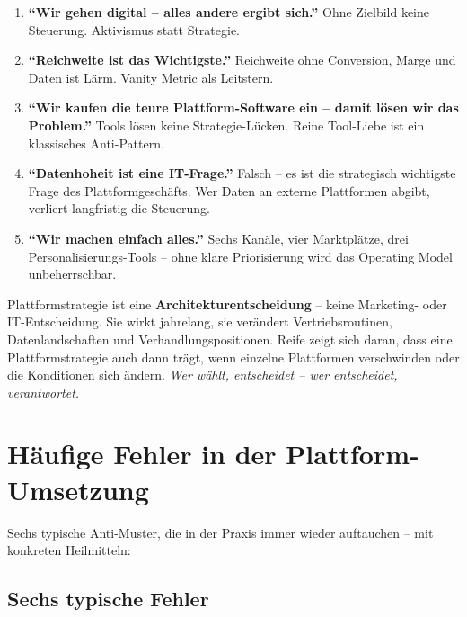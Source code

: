 \documentclass[11pt,a4paper,oneside]{article}
\newcommand{\fachbegriff}[1]{\textbf{#1}}
\begin{document}
\begin{enumerate}
  \item \fachbegriff{``Wir gehen digital -- alles andere ergibt sich.''} Ohne Zielbild keine Steuerung. Aktivismus statt Strategie.
  \item \fachbegriff{``Reichweite ist das Wichtigste.''} Reichweite ohne Conversion, Marge und Daten ist Lärm. Vanity Metric als Leitstern.
  \item \fachbegriff{``Wir kaufen die teure Plattform-Software ein -- damit lösen wir das Problem.''} Tools lösen keine Strategie-Lücken. Reine Tool-Liebe ist ein klassisches Anti-Pattern.
  \item \fachbegriff{``Datenhoheit ist eine IT-Frage.''} Falsch -- es ist die strategisch wichtigste Frage des Plattform­geschäfts. Wer Daten an externe Plattformen abgibt, verliert langfristig die Steuerung.
  \item \fachbegriff{``Wir machen einfach alles.''} Sechs Kanäle, vier Marktplätze, drei Personalisierungs-Tools -- ohne klare Priorisierung wird das Operating Model unbeherrschbar.
\end{enumerate}

\begin{merkbox}
Plattform­strategie ist eine \textbf{Architektur­entscheidung} -- keine Marketing- oder IT-Entscheidung. Sie wirkt jahrelang, sie verändert Vertriebs­routinen, Datenlandschaften und Verhandlungs­positionen. Reife zeigt sich daran, dass eine Plattform­strategie auch dann trägt, wenn einzelne Plattformen verschwinden oder die Konditionen sich ändern. \emph{Wer wählt, entscheidet -- wer entscheidet, verantwortet.}
\end{merkbox}

\section{Häufige Fehler in der Plattform-Umsetzung}

Sechs typische Anti-Muster, die in der Praxis immer wieder auftauchen -- mit konkreten Heilmitteln:

\subsection{Sechs typische Fehler}
\end{document}
